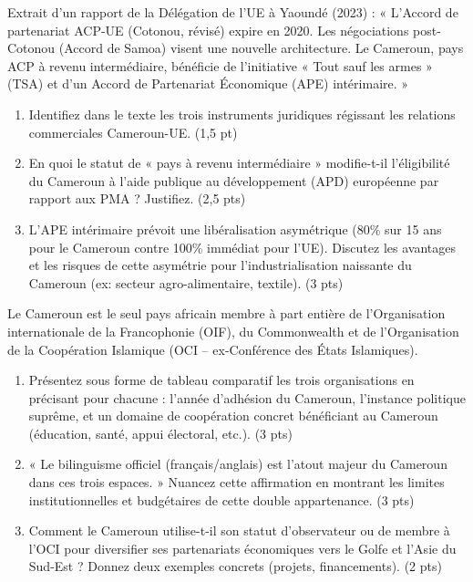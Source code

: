 \documentclass[11pt]{article}
\begin{document}
\begin{exercice}
Extrait d'un rapport de la Délégation de l'UE à Yaoundé (2023) : « L'Accord de partenariat ACP-UE (Cotonou, révisé) expire en 2020. Les négociations post-Cotonou (Accord de Samoa) visent une nouvelle architecture. Le Cameroun, pays ACP à revenu intermédiaire, bénéficie de l'initiative « Tout sauf les armes » (TSA) et d'un Accord de Partenariat Économique (APE) intérimaire. »

\begin{enumerate}
\item Identifiez dans le texte les trois instruments juridiques régissant les relations commerciales Cameroun-UE. (1,5 pt)
\item En quoi le statut de « pays à revenu intermédiaire » modifie-t-il l'éligibilité du Cameroun à l'aide publique au développement (APD) européenne par rapport aux PMA ? Justifiez. (2,5 pts)
\item L'APE intérimaire prévoit une libéralisation asymétrique (80\% sur 15 ans pour le Cameroun contre 100\% immédiat pour l'UE). Discutez les avantages et les risques de cette asymétrie pour l'industrialisation naissante du Cameroun (ex: secteur agro-alimentaire, textile). (3 pts)
\end{enumerate}
\end{exercice}

\begin{exercice}
Le Cameroun est le seul pays africain membre à part entière de l'Organisation internationale de la Francophonie (OIF), du Commonwealth et de l'Organisation de la Coopération Islamique (OCI -- ex-Conférence des États Islamiques).

\begin{enumerate}
\item Présentez sous forme de tableau comparatif les trois organisations en précisant pour chacune : l'année d'adhésion du Cameroun, l'instance politique suprême, et un domaine de coopération concret bénéficiant au Cameroun (éducation, santé, appui électoral, etc.). (3 pts)
\item « Le bilinguisme officiel (français/anglais) est l'atout majeur du Cameroun dans ces trois espaces. » Nuancez cette affirmation en montrant les limites institutionnelles et budgétaires de cette double appartenance. (3 pts)
\item Comment le Cameroun utilise-t-il son statut d'observateur ou de membre à l'OCI pour diversifier ses partenariats économiques vers le Golfe et l'Asie du Sud-Est ? Donnez deux exemples concrets (projets, financements). (2 pts)
\end{enumerate}
\end{exercice}
\end{document}
